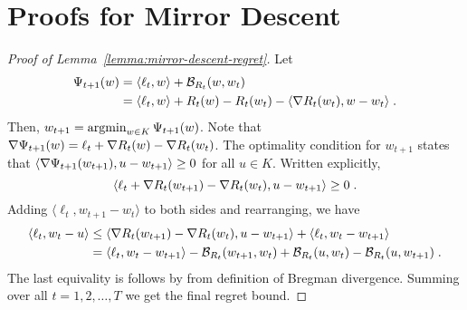 \section{Proofs for Mirror Descent}
\label{section:mirror-descent-proofs}

\begin{proof}[Proof of Lemma~\ref{lemma:mirror-descent-regret}]
Let
\begin{align*}
\Psi_{t+1}(w)
& = \langle \ell_t, w \rangle + \mathcal{B}_{R_t}(w,w_t) \\
& = \langle \ell_t, w \rangle + R_t(w) - R_t(w_t) - \langle \nabla R_t(w_t) , w - w_t \rangle \; .
\end{align*}
Then, $w_{t+1} = \operatorname*{argmin}_{w \in K} \Psi_{t+1}(w)$. Note that $\nabla
\Psi_{t+1}(w) = \ell_t + \nabla R_t(w) - \nabla R_t(w_t)$. The optimality
condition for $w_{t+1}$ states that $\langle \nabla \Psi_{t+1}(w_{t+1}), u -
w_{t+1} \rangle \ge 0$ for all $u \in K$. Written explicitly,
$$
\langle \ell_t + \nabla R_t(w_{t+1}) - \nabla R_t(w_t), u - w_{t+1} \rangle \ge 0 \; .
$$
Adding $\langle \ell_t, w_{t+1} - w_t \rangle$ to both sides and rearranging, we have
\begin{align*}
\langle \ell_t, w_t - u \rangle
& \le \langle \nabla R_t(w_{t+1}) - \nabla R_t(w_t), u - w_{t+1} \rangle  + \langle \ell_t, w_t - w_{t+1} \rangle \\
& = \langle \ell_t, w_t - w_{t+1} \rangle - \mathcal{B}_{R_t}(w_{t+1}, w_t) + \mathcal{B}_{R_t}(u,w_t) - \mathcal{B}_{R_t}(u, w_{t+1}) \; .
\end{align*}
The last equivality is follows by from definition of Bregman divergence.
Summing over all $t=1,2,\dots,T$ we get the final regret bound.
\end{proof}

